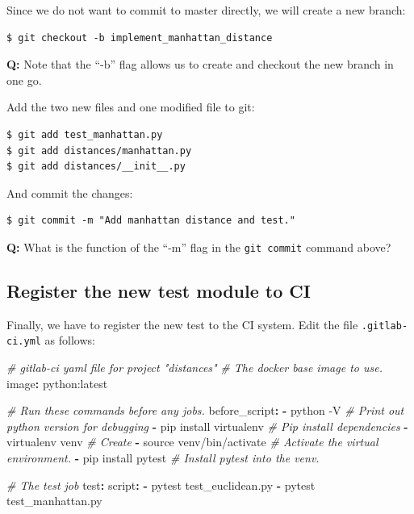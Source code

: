 \documentclass[11pt]{article}
\newenvironment{Shaded}{}{}
\newcommand{\KeywordTok}[1]{\textcolor[rgb]{0.00,0.44,0.13}{\textbf{{#1}}}}
\newcommand{\CommentTok}[1]{\textcolor[rgb]{0.38,0.63,0.69}{\textit{{#1}}}}
\newcommand{\FunctionTok}[1]{\textcolor[rgb]{0.02,0.16,0.49}{{#1}}}
\newcommand{\AttributeTok}[1]{\textcolor[rgb]{0.49,0.56,0.16}{{#1}}}
\begin{document}
    Since we do not want to commit to master directly, we will create a new
branch:

\begin{verbatim}
$ git checkout -b implement_manhattan_distance
\end{verbatim}

\textbf{Q:} Note that the ``-b'' flag allows us to create and checkout
the new branch in one go.

Add the two new files and one modified file to git:

\begin{verbatim}
$ git add test_manhattan.py
$ git add distances/manhattan.py
$ git add distances/__init__.py
\end{verbatim}

And commit the changes:

\begin{verbatim}
$ git commit -m "Add manhattan distance and test."
\end{verbatim}

\textbf{Q:} What is the function of the ``-m'' flag in the
\texttt{git\ commit} command above?

    \hypertarget{register-the-new-test-module-to-ci}{%
\subsection{Register the new test module to
CI}\label{register-the-new-test-module-to-ci}}

Finally, we have to register the new test to the CI system. Edit the
file \texttt{.gitlab-ci.yml} as follows:

\begin{Shaded}
\begin{Highlighting}[]
\CommentTok{\# gitlab{-}ci yaml file for project "distances"}
\CommentTok{\# The docker base image to use.}
\FunctionTok{image}\KeywordTok{:}\AttributeTok{ python:latest}

\CommentTok{\# Run these commands before any jobs.}
\FunctionTok{before\_script}\KeywordTok{:}
\AttributeTok{  }\KeywordTok{{-}}\AttributeTok{ python {-}V}\CommentTok{                 \# Print out python version for debugging}
\AttributeTok{  }\KeywordTok{{-}}\AttributeTok{ pip install virtualenv}\CommentTok{    \# Pip install dependencies}
\AttributeTok{  }\KeywordTok{{-}}\AttributeTok{ virtualenv venv}\CommentTok{           \# Create }
\AttributeTok{  }\KeywordTok{{-}}\AttributeTok{ source venv/bin/activate}\CommentTok{  \# Activate the virtual environment.}
\AttributeTok{  }\KeywordTok{{-}}\AttributeTok{ pip install pytest}\CommentTok{        \# Install pytest into the venv.}

\CommentTok{\# The test job }
\FunctionTok{test}\KeywordTok{:}
\AttributeTok{  }\FunctionTok{script}\KeywordTok{:}
\AttributeTok{    }\KeywordTok{{-}}\AttributeTok{ pytest test\_euclidean.py}
\AttributeTok{    }\KeywordTok{{-}}\AttributeTok{ pytest test\_manhattan.py}
\end{Highlighting}
\end{Shaded}
\end{document}
